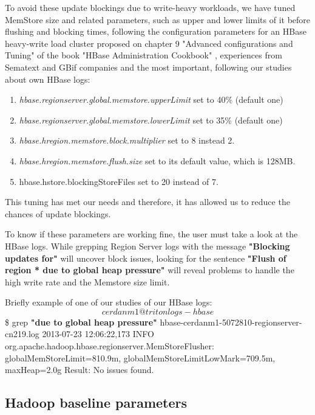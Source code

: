 \begin{enumerate}
To avoid these update blockings due to write-heavy workloads, we have tuned MemStore size and related parameters, such as upper and lower limits of it before flushing and blocking times, following the configuration parameters for an HBase heavy-write load cluster  proposed on chapter 9 "Advanced configurations and Tuning" of the book "HBase Administration Cookbook" \cite{jiang2012hbase}, experiences from Sematext \cite{MemstoreSematext} and GBif companies \cite{MemstoreGBif} and the most important, following our studies about own HBase logs:
\bigskip
\begin{enumerate}
\item \textit{hbase.regionserver.global.memstore.upperLimit} set to 40\% (default one)
\item \textit{hbase.regionserver.global.memstore.lowerLimit} set to 35\% (default one)
\item \textit{hbase.hregion.memstore.block.multiplier} set to 8 instead 2.
\item \textit{hbase.hregion.memstore.flush.size} set to its default value, which is 128MB.
\item {hbase.hstore.blockingStoreFiles} set to 20 instead of 7.
\end{enumerate}

This tuning has met our needs and therefore, it has allowed us to reduce the chances of update blockings.
\par
To know if these parameters are working fine, the user must take a look at the HBase logs. While grepping Region Server logs with the message \textbf{"Blocking updates for"} will uncover block issues, looking for the sentence \textbf{"Flush of region * due to global heap pressure"} will reveal problems to handle the high write rate and the Memstore size limit. 
\par
Briefly example of one of our studies of our HBase logs:
\bigskip
\[cerdanm1@triton logs-hbase\]\$ grep \textbf{"due to global heap pressure"} hbase-cerdanm1-5072810-regionserver-cn219.log 
2013-07-23 12:06:22,173 INFO org.apache.hadoop.hbase.regionserver.MemStoreFlusher: globalMemStoreLimit=810.9m, globalMemStoreLimitLowMark=709.5m, maxHeap=2.0g
\bigskip
Result: No issues found.

\end{enumerate}


\subsection{Hadoop baseline parameters}

